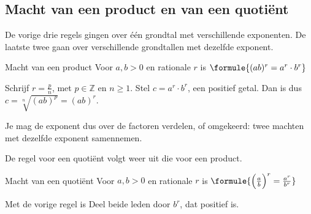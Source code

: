 \begin{oefeningen}
\end{oefeningen}

\subsection{Macht van een product en van een quotiënt}

De vorige drie regels gingen over één grondtal met verschillende exponenten. De laatste twee gaan over verschillende grondtallen met dezelfde exponent.

\begin{theorie}
\begin{stelling}{Macht van een product}
Voor $a, b > 0$ en rationale $r$ is \qquad $\formule{(ab)^r = a^r \cdot b^r}$
\end{stelling}
\begin{bewijs}
Schrijf $r = \frac{p}{n}$, met $p \in \mathbb{Z}$ en $n \geqslant 1$. Stel $c = a^r \cdot b^r$, een positief getal. Dan is
dus $c = \sqrt[n]{(ab)^p} = (ab)^r$.
\end{bewijs}
\end{theorie}

Je mag de exponent dus over de factoren verdelen, of omgekeerd: twee machten met dezelfde exponent samennemen.


\begin{oefeningen}
\end{oefeningen}

De regel voor een quotiënt volgt weer uit die voor een product.

\begin{theorie}
\begin{stelling}{Macht van een quotiënt}
Voor $a, b > 0$ en rationale $r$ is \qquad $\formule{\Bigl(\frac{a}{b}\Bigr)^r = \frac{a^r}{b^r}}$
\end{stelling}
\begin{bewijs}
Met de vorige regel is
Deel beide leden door $b^r$, dat positief is.
\end{bewijs}
\end{theorie}

